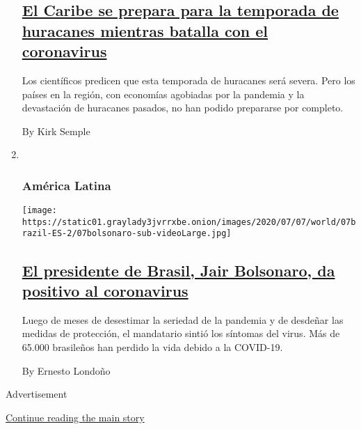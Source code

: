\begin{enumerate}
  \hypertarget{el-caribe-se-prepara-para-la-temporada-de-huracanes-mientras-batalla-con-el-coronavirus}{%
  \subsection{\texorpdfstring{\href{/es/2020/07/08/espanol/america-latina/huracanes-caribe-coronavirus.html}{El
  Caribe se prepara para la temporada de huracanes mientras batalla con
  el
  coronavirus}}{El Caribe se prepara para la temporada de huracanes mientras batalla con el coronavirus}}\label{el-caribe-se-prepara-para-la-temporada-de-huracanes-mientras-batalla-con-el-coronavirus}}

  Los científicos predicen que esta temporada de huracanes será severa.
  Pero los países en la región, con economías agobiadas por la pandemia
  y la devastación de huracanes pasados, no han podido prepararse por
  completo.

  By Kirk Semple
\item ~
  \hypertarget{amuxe9rica-latina-2}{%
  \subsubsection{América Latina}\label{amuxe9rica-latina-2}}

  \texttt{[image: https://static01.graylady3jvrrxbe.onion/images/2020/07/07/world/07brazil-ES-2/07bolsonaro-sub-videoLarge.jpg]}

  \hypertarget{el-presidente-de-brasil-jair-bolsonaro-da-positivo-al-coronavirus}{%
  \subsection{\texorpdfstring{\href{/es/2020/07/07/espanol/america-latina/bolsonaro-coronavirus.html}{El
  presidente de Brasil, Jair Bolsonaro, da positivo al
  coronavirus}}{El presidente de Brasil, Jair Bolsonaro, da positivo al coronavirus}}\label{el-presidente-de-brasil-jair-bolsonaro-da-positivo-al-coronavirus}}

  Luego de meses de desestimar la seriedad de la pandemia y de desdeñar
  las medidas de protección, el mandatario sintió los síntomas del
  virus. Más de 65.000 brasileños han perdido la vida debido a la
  COVID-19.

  By Ernesto Londoño
\end{enumerate}

Advertisement

\protect\hyperlink{after-mid1}{Continue reading the main story}

